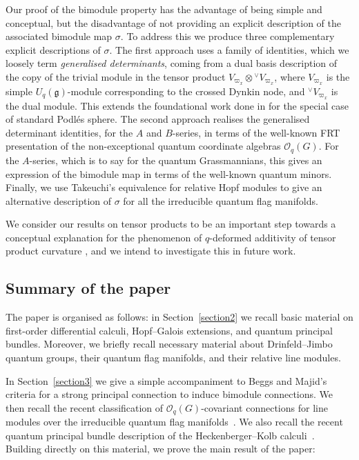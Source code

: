 \documentclass[pdftex]{sigma}
\numberwithin{equation}{section}
\begin{document}
Our proof of the bimodule property has the advantage of being simple and conceptual, but the disadvantage of not providing an explicit description of the associated bimodule map $\sigma$. To address this we produce three complementary explicit descriptions of $\sigma$. The first approach uses a family of identities, which we loosely term \emph{generalised determinants}, coming from a dual basis description of the copy of the trivial module in the tensor product $V_{\varpi_x} \otimes {}^{\vee}V_{\varpi_x}$, where $V_{\varpi_x}$ is the simple $U_q(\mathfrak{g})$-module corresponding to the crossed Dynkin node, and ${}^{\vee}V_{\varpi_x}$ is the dual module. This extends the foundational work done in \cite{Maj} for the special case of standard Podl\'es sphere.
The second approach realises the generalised determinant identities, for the $A$ and $B$-series, in terms of the well-known FRT presentation \cite{FRT89} of the non-exceptional quantum coordinate algebras $\mathcal{O}_q(G)$. For the $A$-series, which is to say for the quantum Grassmannians, this gives an expression of the bimodule map in terms of the well-known quantum minors. Finally, we use Takeuchi's equivalence for relative Hopf modules \cite{Tak} to give an alternative description of $\sigma$ for all the irreducible quantum flag manifolds.

We consider our results on tensor products to be an important step towards a conceptual explanation for the phenomenon of $q$-deformed additivity of tensor product curvature \cite[Example~5.51]{BeggsMajid:Leabh}, and we intend to investigate this in future work.

\subsection{Summary of the paper}

The paper is organised as follows: in Section~\ref{section2} we recall basic material on first-order differential calculi, Hopf--Galois extensions, and quantum principal bundles. Moreover, we briefly recall necessary material about Drinfeld--Jimbo quantum groups, their quantum flag manifolds, and their relative line modules.


In Section~\ref{section3} we give a simple accompaniment to Beggs and Majid's criteria for a strong principal connection to induce bimodule connections. We then recall the recent classification of $\mathcal{O}_q(G)$-covariant connections for line modules over the irreducible quantum flag manifolds~\cite{HVBQFM}. We also recall the recent quantum principal bundle description of the Heckenberger--Kolb calculi~\cite{CDOBBW}. Building directly on this material, we prove the main result of the paper:
\end{document}
